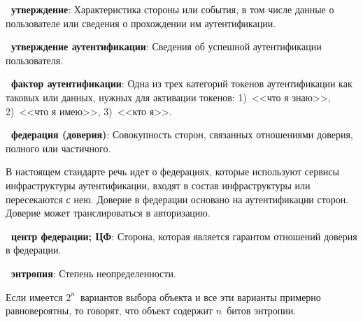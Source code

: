 
{\bf \thedefctr~утверждение}:
Характеристика стороны или события, в том числе данные о пользователе или
сведения о прохождении им аутентификации.

{\bf \thedefctr~утверждение аутентификации}:
Сведения об успешной аутентификации пользователя.

{\bf \thedefctr~фактор аутентификации}:
Одна из трех категорий токенов аутентификации как таковых
или данных, нужных для активации токенов:
1)~<<что я знаю>>, 2)~<<что я имею>>, 3)~<<кто я>>.


{\bf \thedefctr~федерация (доверия)}:
Совокупность сторон, связанных отношениями доверия, полного или частичного.

\begin{note*}
В настоящем стандарте речь идет о федерациях, которые используют 
сервисы инфраструктуры аутентификации, входят в состав инфраструктуры
или пересекаются с нею. 
%
Доверие в федерации основано на аутентификации сторон.
Доверие может транслироваться в авторизацию. 
\end{note*}



{\bf \thedefctr~центр федерации; ЦФ}:
Сторона, которая является гарантом отношений доверия в федерации.


{\bf \thedefctr~энтропия}:
Степень неопределенности. 

\begin{note*}
Если имеется $2^n$~вариантов выбора объекта и все эти варианты примерно
равновероятны, то говорят, что объект содержит $n$~битов энтропии.
\end{note*}

